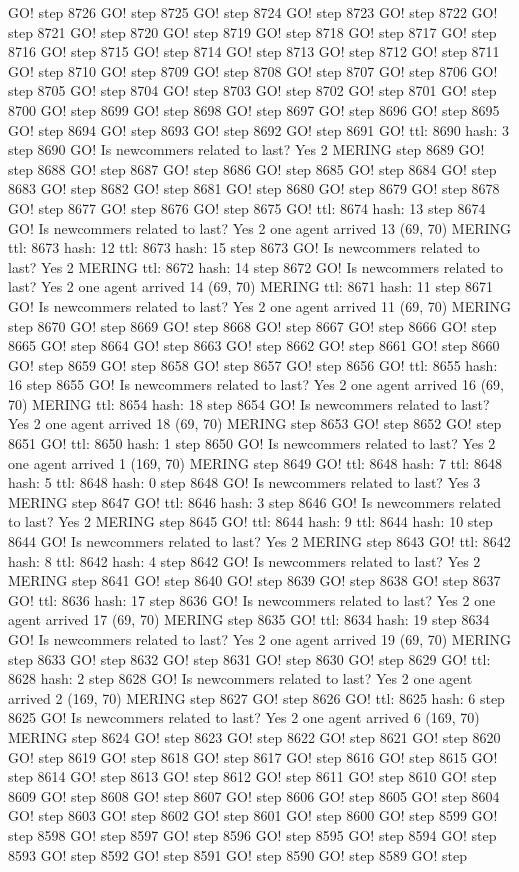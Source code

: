 GO! step 8726 GO! step 8725 GO! step 8724 GO! step 8723 GO! step 8722 GO! step 8721 GO! step 8720 GO! step 8719 GO! step 8718 GO! step 8717 GO! step 8716 GO! step 8715 GO! step 8714 GO! step 8713 GO! step 8712 GO! step 8711 GO! step 8710 GO! step 8709 GO! step 8708 GO! step 8707 GO! step 8706 GO! step 8705 GO! step 8704 GO! step 8703 GO! step 8702 GO! step 8701 GO! step 8700 GO! step 8699 GO! step 8698 GO! step 8697 GO! step 8696 GO! step 8695 GO! step 8694 GO! step 8693 GO! step 8692 GO! step 8691 GO! ttl: 8690 hash: 3 step 8690 GO! Is newcommers related to last? Yes 2 MERING step 8689 GO! step 8688 GO! step 8687 GO! step 8686 GO! step 8685 GO! step 8684 GO! step 8683 GO! step 8682 GO! step 8681 GO! step 8680 GO! step 8679 GO! step 8678 GO! step 8677 GO! step 8676 GO! step 8675 GO! ttl: 8674 hash: 13 step 8674 GO! Is newcommers related to last? Yes 2 one agent arrived 13 (69, 70) MERING ttl: 8673 hash: 12 ttl: 8673 hash: 15 step 8673 GO! Is newcommers related to last? Yes 2 MERING ttl: 8672 hash: 14 step 8672 GO! Is newcommers related to last? Yes 2 one agent arrived 14 (69, 70) MERING ttl: 8671 hash: 11 step 8671 GO! Is newcommers related to last? Yes 2 one agent arrived 11 (69, 70) MERING step 8670 GO! step 8669 GO! step 8668 GO! step 8667 GO! step 8666 GO! step 8665 GO! step 8664 GO! step 8663 GO! step 8662 GO! step 8661 GO! step 8660 GO! step 8659 GO! step 8658 GO! step 8657 GO! step 8656 GO! ttl: 8655 hash: 16 step 8655 GO! Is newcommers related to last? Yes 2 one agent arrived 16 (69, 70) MERING ttl: 8654 hash: 18 step 8654 GO! Is newcommers related to last? Yes 2 one agent arrived 18 (69, 70) MERING step 8653 GO! step 8652 GO! step 8651 GO! ttl: 8650 hash: 1 step 8650 GO! Is newcommers related to last? Yes 2 one agent arrived 1 (169, 70) MERING step 8649 GO! ttl: 8648 hash: 7 ttl: 8648 hash: 5 ttl: 8648 hash: 0 step 8648 GO! Is newcommers related to last? Yes 3 MERING step 8647 GO! ttl: 8646 hash: 3 step 8646 GO! Is newcommers related to last? Yes 2 MERING step 8645 GO! ttl: 8644 hash: 9 ttl: 8644 hash: 10 step 8644 GO! Is newcommers related to last? Yes 2 MERING step 8643 GO! ttl: 8642 hash: 8 ttl: 8642 hash: 4 step 8642 GO! Is newcommers related to last? Yes 2 MERING step 8641 GO! step 8640 GO! step 8639 GO! step 8638 GO! step 8637 GO! ttl: 8636 hash: 17 step 8636 GO! Is newcommers related to last? Yes 2 one agent arrived 17 (69, 70) MERING step 8635 GO! ttl: 8634 hash: 19 step 8634 GO! Is newcommers related to last? Yes 2 one agent arrived 19 (69, 70) MERING step 8633 GO! step 8632 GO! step 8631 GO! step 8630 GO! step 8629 GO! ttl: 8628 hash: 2 step 8628 GO! Is newcommers related to last? Yes 2 one agent arrived 2 (169, 70) MERING step 8627 GO! step 8626 GO! ttl: 8625 hash: 6 step 8625 GO! Is newcommers related to last? Yes 2 one agent arrived 6 (169, 70) MERING step 8624 GO! step 8623 GO! step 8622 GO! step 8621 GO! step 8620 GO! step 8619 GO! step 8618 GO! step 8617 GO! step 8616 GO! step 8615 GO! step 8614 GO! step 8613 GO! step 8612 GO! step 8611 GO! step 8610 GO! step 8609 GO! step 8608 GO! step 8607 GO! step 8606 GO! step 8605 GO! step 8604 GO! step 8603 GO! step 8602 GO! step 8601 GO! step 8600 GO! step 8599 GO! step 8598 GO! step 8597 GO! step 8596 GO! step 8595 GO! step 8594 GO! step 8593 GO! step 8592 GO! step 8591 GO! step 8590 GO! step 8589 GO! step 